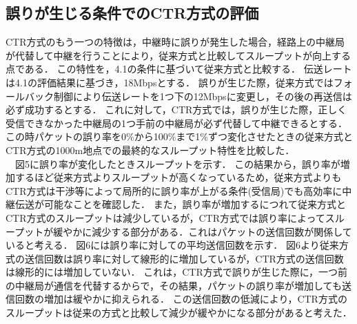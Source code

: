 \documentclass[a4paper,10pt]{ltjsarticle}
\begin{document}
\subsection{誤りが生じる条件でのCTR方式の評価}%
CTR方式のもう一つの特徴は，中継時に誤りが発生した場合，経路上の中継局が代替して中継を行うことにより，従来方式と比較してスループットが向上する点である．
この特性を，4.1の条件に基づいて従来方式と比較する．
伝送レートは4.1の評価結果に基づき，18Mbpsとする．
誤りが生じた際，従来方式ではフォールバック制御により伝送レートを1つ下の12Mbpsに変更し，その後の再送信は必ず成功するとする．
これに対して，CTR方式では，誤りが生じた際，正しく受信できなかった中継局の1つ手前の中継局が必ず代替して中継できるとする．
この時パケットの誤り率を0\%から100\%まで1\%ずつ変化させたときの従来方式とCTR方式の1000m地点での最終的なスループット特性を比較した．
\\　図5に誤り率が変化したときスループットを示す．
この結果から，誤り率が増加するほど従来方式よりスループットが高くなっているため，従来方式よりもCTR方式は干渉等によって局所的に誤り率が上がる条件(受信局)でも高効率に中継伝送が可能なことを確認した．
また，誤り率が増加するにつれて従来方式とCTR方式のスループットは減少しているが，CTR方式では誤り率によってスループットが緩やかに減少する部分がある．これはパケットの送信回数が関係していると考える．
図6には誤り率に対しての平均送信回数を示す．
図6より従来方式の送信回数は誤り率に対して線形的に増加しているが，CTR方式の送信回数は線形的には増加していない．
これは，CTR方式で誤りが生じた際に，一つ前の中継局が通信を代替するからで，その結果，パケットの誤り率が増加しても送信回数の増加は緩やかに抑えられる．
この送信回数の低減により，CTR方式のスループットは従来の方式と比較して減少が緩やかになる部分があると考えた．
\end{document}
